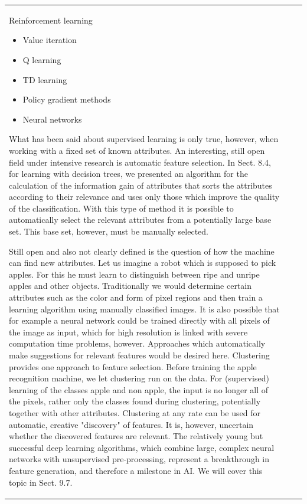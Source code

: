 \documentclass[10pt]{book}
\begin{document}
\begin{center}
\begin{tabular}{|l|l|l|}
Reinforcement learning

\begin{itemize}
  \item Value iteration
  \item Q learning
  \item TD learning
  \item Policy gradient methods
  \item Neural networks
\end{itemize}

What has been said about supervised learning is only true, however, when working with a fixed set of known attributes. An interesting, still open field under intensive research is automatic feature selection. In Sect. 8.4, for learning with decision trees, we presented an algorithm for the calculation of the information gain of attributes that sorts the attributes according to their relevance and uses only those which improve the quality of the classification. With this type of method it is possible to automatically select the relevant attributes from a potentially large base set. This base set, however, must be manually selected.

Still open and also not clearly defined is the question of how the machine can find new attributes. Let us imagine a robot which is supposed to pick apples. For this he must learn to distinguish between ripe and unripe apples and other objects. Traditionally we would determine certain attributes such as the color and form of pixel regions and then train a learning algorithm using manually classified images. It is also possible that for example a neural network could be trained directly with all pixels of the image as input, which for high resolution is linked with severe computation time problems, however. Approaches which automatically make suggestions for relevant features would be desired here.
Clustering provides one approach to feature selection. Before training the apple recognition machine, we let clustering run on the data. For (supervised) learning of the classes apple and non apple, the input is no longer all of the pixels, rather only the classes found during clustering, potentially together with other attributes. Clustering at any rate can be used for automatic, creative "discovery" of features. It is, however, uncertain whether the discovered features are relevant. The relatively young but successful deep learning algorithms, which combine large, complex neural networks with unsupervised pre-processing, represent a breakthrough in feature generation, and therefore a milestone in AI. We will cover this topic in Sect. 9.7.


\end{tabular}
\end{center}
\end{document}
